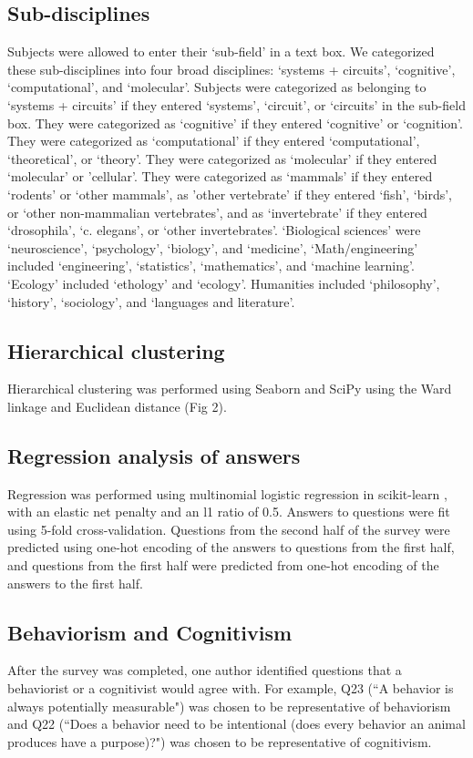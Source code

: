 \documentclass[a4paper, 11pt]{article}
\begin{document}
\subsection*{Sub-disciplines}
Subjects were allowed to enter their `sub-field' in a text box. We categorized these sub-disciplines into four broad disciplines: `systems + circuits', `cognitive', `computational', and `molecular'. Subjects were categorized as belonging to `systems + circuits' if they entered `systems', `circuit', or `circuits' in the sub-field box. They were categorized as `cognitive' if they entered `cognitive' or `cognition'. They were categorized as `computational' if they entered `computational', `theoretical', or `theory'. They were categorized as `molecular' if they entered `molecular' or 'cellular'. They were categorized as `mammals' if they entered `rodents' or `other mammals', as 'other vertebrate' if they entered `fish', `birds', or `other non-mammalian vertebrates', and as `invertebrate' if they entered `drosophila', `c. elegans', or `other invertebrates'. `Biological sciences' were `neuroscience', `psychology', `biology', and `medicine', `Math/engineering' included `engineering', `statistics', `mathematics', and `machine learning'. `Ecology' included `ethology' and `ecology'. Humanities included `philosophy', `history', `sociology', and `languages and literature'.

\subsection*{Hierarchical clustering}
Hierarchical clustering was performed using Seaborn and SciPy \cite{2020SciPy-NMeth,waskom2020seaborn} using the Ward linkage and Euclidean distance (Fig 2).

\subsection*{Regression analysis of answers}
Regression was performed using multinomial logistic regression in scikit-learn \cite{scikit-learn}, with an elastic net penalty and an l1 ratio of 0.5. Answers to questions were fit using 5-fold cross-validation. Questions from the second half of the survey were predicted using one-hot encoding of the answers to questions from the first half, and questions from the first half were predicted from one-hot encoding of the answers to the first half.

\subsection*{Behaviorism and Cognitivism}
After the survey was completed, one author identified questions that a  behaviorist or a cognitivist would agree with. For example, Q23 (``A behavior is always potentially measurable") was chosen to be representative of behaviorism and Q22 (``Does a behavior need to be intentional (does every behavior an animal produces have a purpose)?") was chosen to be representative of cognitivism.
\end{document}
